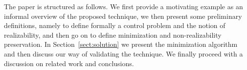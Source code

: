 
The paper is structured as follows. We first provide a motivating example as an informal overview of the proposed technique, we then present some preliminary definitions, namely to define formally a control problem and the notion of realizability, and then go on to define minimization and non-realizability preservation. In Section~\ref{sect:solution} we present the minimization algorithm and then discuss our way of validating the technique. We finally proceed with a discussion on related work and conclusions.